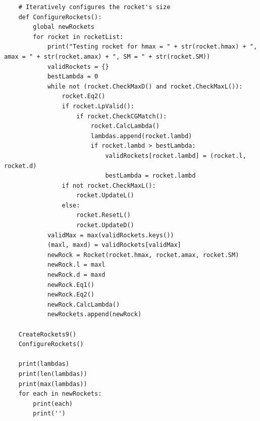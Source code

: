 \documentclass{report}
\begin{document}
\begin{lstlisting}
    # Iteratively configures the rocket's size
    def ConfigureRockets():
        global newRockets
        for rocket in rocketList:
            print("Testing rocket for hmax = " + str(rocket.hmax) + ", amax = " + str(rocket.amax) + ", SM = " + str(rocket.SM))
            validRockets = {}
            bestLambda = 0
            while not (rocket.CheckMaxD() and rocket.CheckMaxL()):
                rocket.Eq2()
                if rocket.LpValid():
                    if rocket.CheckCGMatch():
                        rocket.CalcLambda()
                        lambdas.append(rocket.lambd)
                        if rocket.lambd > bestLambda:
                            validRockets[rocket.lambd] = (rocket.l, rocket.d)
                            bestLambda = rocket.lambd
                if not rocket.CheckMaxL():
                    rocket.UpdateL()
                else:
                    rocket.ResetL()
                    rocket.UpdateD()
            validMax = max(validRockets.keys())
            (maxl, maxd) = validRockets[validMax]
            newRock = Rocket(rocket.hmax, rocket.amax, rocket.SM)
            newRock.l = maxl
            newRock.d = maxd
            newRock.Eq1()
            newRock.Eq2()
            newRock.CalcLambda()
            newRockets.append(newRock)

    CreateRockets9()
    ConfigureRockets()

    print(lambdas)
    print(len(lambdas))
    print(max(lambdas))
    for each in newRockets:
        print(each)
        print('')


\end{lstlisting}
\end{document}
